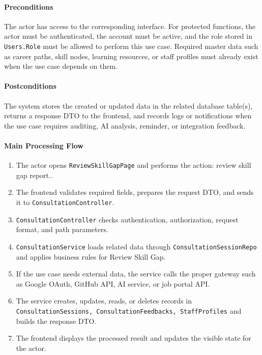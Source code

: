 \paragraph{Preconditions}

The actor has access to the corresponding interface. For protected functions, the actor must be authenticated, the account must be active, and the role stored in \texttt{Users.Role} must be allowed to perform this use case. Required master data such as career paths, skill nodes, learning resources, or staff profiles must already exist when the use case depends on them.

\paragraph{Postconditions}

The system stores the created or updated data in the related database table(s), returns a response DTO to the frontend, and records logs or notifications when the use case requires auditing, AI analysis, reminder, or integration feedback.

\paragraph{Main Processing Flow}

\begin{enumerate}
    \item The actor opens \texttt{ReviewSkillGapPage} and performs the action: review skill gap report..
    \item The frontend validates required fields, prepares the request DTO, and sends it to \texttt{ConsultationController}.
    \item \texttt{ConsultationController} checks authentication, authorization, request format, and path parameters.
    \item \texttt{ConsultationService} loads related data through \texttt{ConsultationSessionRepo} and applies business rules for Review Skill Gap.
    \item If the use case needs external data, the service calls the proper gateway such as Google OAuth, GitHub API, AI service, or job portal API.
    \item The service creates, updates, reads, or deletes records in \texttt{ConsultationSessions, ConsultationFeedbacks, StaffProfiles} and builds the response DTO.
    \item The frontend displays the processed result and updates the visible state for the actor.
\end{enumerate}

